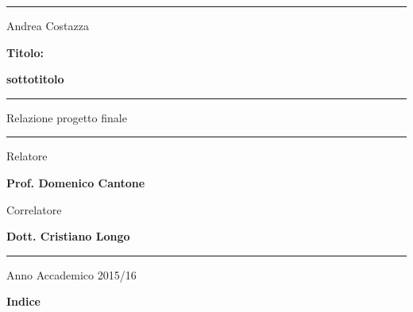 \documentclass[a4paper,11pt]{article}
\begin{document}
\begin{center}
	\hrule
\end{center}

\vspace*{50pt}

\begin{center}
	\LARGE Andrea Costazza
\end{center}

\vspace*{30pt}

\begin{center}
	\LARGE \textbf{Titolo:}

	\LARGE \textbf{sottotitolo}
\end{center}

\vspace*{80pt}

\noindent\hfil\rule{0.2\textwidth}{.4pt}\hfil

\begin{center}
	\Large Relazione progetto finale
\end{center}

\noindent\hfil\rule{0.2\textwidth}{.4pt}\hfil

\vspace*{180pt}

\begin{flushright}
	\Large Relatore

	\Large \textbf {Prof. Domenico Cantone}
\end{flushright}
\begin{flushright}
	\Large Correlatore

	\Large \textbf {Dott. Cristiano Longo}
\end{flushright}

\bigskip
\bigskip

\hrule

\begin{center}
	\Large Anno Accademico 2015/16
\end{center}

\newpage
\null
\thispagestyle{empty}

\newpage

\LARGE{\textbf{Indice}}
\bigskip
  
\end{document}
